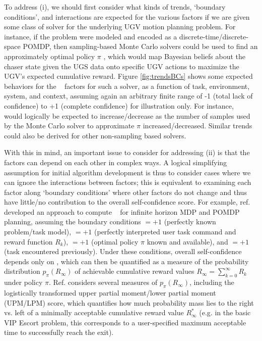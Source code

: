 To address (i), we should first consider what kinds of trends, `boundary conditions', and interactions are expected for the various factors if we are given some class of solver for the underlying UGV motion planning problem. For instance, if the problem were modeled and encoded as a discrete-time/discrete-space POMDP, then sampling-based Monte Carlo solvers could be used to find an approximately optimal policy $\pi$ \cite{Silver-NIPS-2010, Thrun-ProbRobotics-2006}, which would map Bayesian beliefs about the chaser state given the UGS data onto specific UGV actions to maximize the UGV's expected cumulative reward. Figure \ref{fig:trendsBCs} shows some expected behaviors for the \famsec~ factors for such a solver, as a function of task, environment, system, and context, assuming again an arbitrary finite range of -1 (total lack of confidence) to +1 (complete confidence) for illustration only. For instance, \xQ~ would logically be expected to increase/decrease as the number of samples used by the Monte Carlo solver to approximate $\pi$ increased/decreased. Similar trends could also be derived for other non-sampling based solvers. 

With this in mind, an important issue to consider for addressing (ii) is that the factors can depend on each other in complex ways. A logical simplifying assumption for initial algorithm development is thus to consider cases where we can ignore the interactions between factors; this is equivalent to examining each factor along `boundary conditions' where other factors do not change and thus have little/no contribution to the overall self-confidence score. For example, ref. \cite{Aitken2016-cv} developed an approach to compute \xO~ for infinite horizon MDP and POMDP planning, assuming the boundary conditions \xM$=+1$ (perfectly known problem/task model), \xI $= +1$ (perfectly interpreted user task command and reward function $R_k$), \xQ$=+1$ (optimal policy $\pi$ known and available), and \xP$=+1$ (task encountered previously). Under these conditions, overall self-confidence depends only on \xO, which can then be quantified as a measure of the probability distribution $p_{\pi}(R_{\infty})$ of achievable cumulative reward values $R_{\infty} = \sum_{k=0}^{\infty}R_{k}$ under policy $\pi$. Ref. \cite{Aitken2016-cv} considers several measures of $p_{\pi}(R_{\infty})$, including the logistically transformed upper partial moment/lower partial moment (UPM/LPM) score, which quantifies how much probability mass lies to the right vs. left of a minimally acceptable cumulative reward value $R^*_{\infty}$ (e.g. in the basic VIP Escort problem, this corresponds to a user-specified maximum acceptable time to successfully reach the exit).

